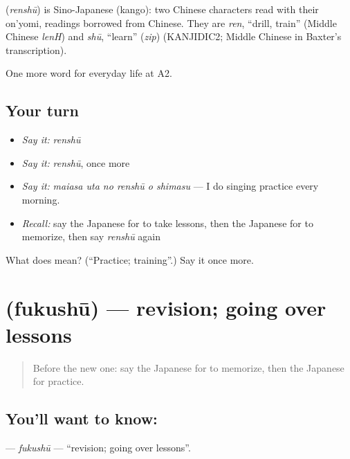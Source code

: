 \begin{cousinweb}
\textbf{} (\emph{renshū}) is Sino-Japanese (kango): two Chinese characters read with their on'yomi, readings borrowed from Chinese. They are \emph{ren}, \textquotedblleft{}drill, train\textquotedblright{} (Middle Chinese \emph{lenH}) and \emph{shū}, \textquotedblleft{}learn\textquotedblright{} (\emph{zip}) (KANJIDIC2; Middle Chinese in Baxter's transcription).
\end{cousinweb}

\begin{grammarlens}[title={What you've built}]
One more word for everyday life at A2.
\end{grammarlens}

\subsection*{Your turn}
\begin{itemize}
\raggedright
  \item \emph{Say it:} \emph{renshū}
  \item \emph{Say it:} \emph{renshū}, once more
  \item \emph{Say it:} \emph{maiasa uta no renshū o shimasu} — I do singing practice every morning.
  \item \emph{Recall:} say the Japanese for to take lessons, then the Japanese for to memorize, then say \emph{renshū} again
\end{itemize}

\begin{tcolorbox}[breakable,colback=teal!4,colframe=teal!35!black,title={Before you move on}]
What does  mean? (\textquotedblleft{}Practice; training\textquotedblright{}.) Say it once more.
\end{tcolorbox}
\section[\texorpdfstring{\ja{ふくしゅう} (fukushū)}{ふくしゅう (fukushū)}]{ (fukushū) — revision; going over lessons}

\label{lesson:JA-C225-fukushuu}



\begin{quote}
Before the new one: say the Japanese for to memorize, then the Japanese for practice.
\end{quote}

\subsection*{You'll want to know: }
\textbf{} — \emph{fukushū} — \textquotedblleft{}revision; going over lessons\textquotedblright{}.

